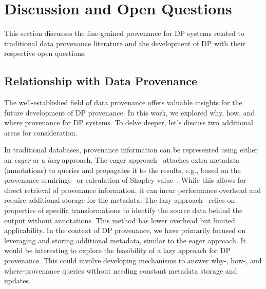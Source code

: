 \section{Discussion and Open Questions}
This section discusses the fine-grained provenance for DP systems related to traditional data provenance literature and the development of DP with their respective open questions.

\subsection{Relationship with Data Provenance}
The well-established field of data provenance offers valuable insights for the future development of DP provenance. In this work, we explored why, how, and where provenance for DP systems. To delve deeper, let's discuss two additional areas for consideration.

In traditional databases, provenance information can be represented using either an \emph{eager} or a \emph{lazy} approach. The eager approach~\cite{BunemanKT02annotations} attaches extra metadata (annotations) to queries and propagates it to the results, e.g., based on the provenance semirings~\cite{GreenT17provenance_semiring} or calculation of Shapley value~\cite{LuoPCX22,LuoPXZX24}. While this allows for direct retrieval of provenance information, it can incur performance overhead and require additional storage for the metadata. The lazy approach~\cite{cheney2009provenance} relies on properties of specific transformations to identify the source data behind the output without annotations. This method has lower overhead but limited applicability. In the context of DP provenance, we have primarily focused on leveraging and storing additional metadata, similar to the eager approach. It would be interesting to explore the feasibility of a lazy approach for DP provenance. This could involve developing mechanisms to answer why-, how-, and where-provenance queries without needing constant metadata storage and updates.


